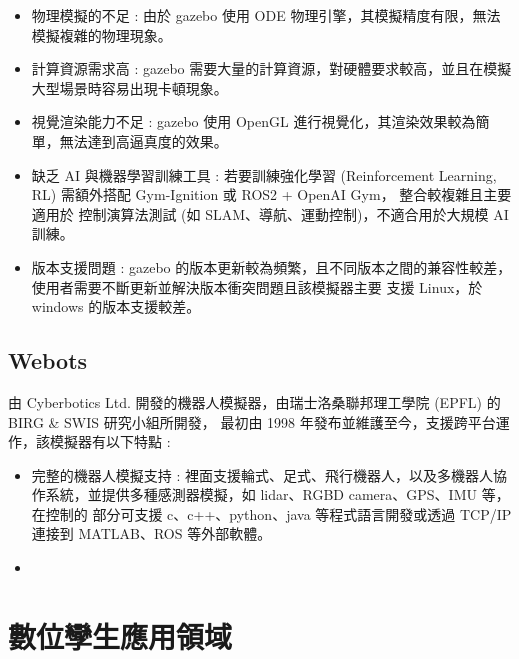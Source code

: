 \begin{itemize}
    \item 物理模擬的不足 :
          由於 gazebo 使用 ODE 物理引擎，其模擬精度有限，無法模擬複雜的物理現象。
    \item 計算資源需求高 :
          gazebo 需要大量的計算資源，對硬體要求較高，並且在模擬大型場景時容易出現卡頓現象。
    \item 視覺渲染能力不足 :
          gazebo 使用 OpenGL 進行視覺化，其渲染效果較為簡單，無法達到高逼真度的效果。
    \item 缺乏 AI 與機器學習訓練工具 :
          若要訓練強化學習 (Reinforcement Learning, RL) 需額外搭配 Gym-Ignition 或 ROS2 + OpenAI Gym，
          整合較複雜且主要適用於 控制演算法測試 (如 SLAM、導航、運動控制)，不適合用於大規模 AI 訓練。
    \item 版本支援問題 :
          gazebo 的版本更新較為頻繁，且不同版本之間的兼容性較差，使用者需要不斷更新並解決版本衝突問題且該模擬器主要
          支援 Linux，於 windows 的版本支援較差。
\end{itemize}
\subsection{Webots}
由 Cyberbotics Ltd. \cite{Michel2004Webots} 開發的機器人模擬器，由瑞士洛桑聯邦理工學院 (EPFL) 的 BIRG & SWIS 研究小組所開發，
最初由 1998 年發布並維護至今，支援跨平台運作，該模擬器有以下特點 :
\begin{itemize}
    \item 完整的機器人模擬支持 :
          裡面支援輪式、足式、飛行機器人，以及多機器人協作系統，並提供多種感測器模擬，如 lidar、RGBD camera、GPS、IMU 等，在控制的
          部分可支援 c、c++、python、java 等程式語言開發或透過 TCP/IP 連接到 MATLAB、ROS 等外部軟體。
    \item
\end{itemize}
\section{數位孿生應用領域}
